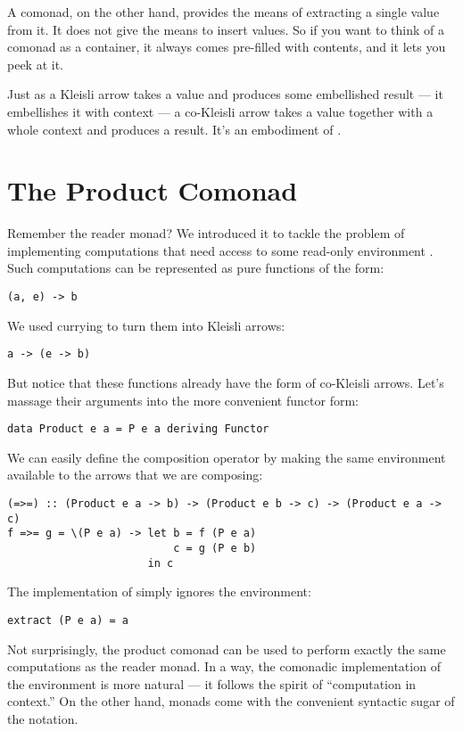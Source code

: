 A comonad, on the other hand, provides the means of extracting a single
value from it. It does not give the means to insert values. So if you
want to think of a comonad as a container, it always comes pre-filled
with contents, and it lets you peek at it.

Just as a Kleisli arrow takes a value and produces some embellished
result --- it embellishes it with context --- a co-Kleisli arrow takes a
value together with a whole context and produces a result. It's an
embodiment of .

\section{The Product Comonad}\label{the-product-comonad}

Remember the reader monad? We introduced it to tackle the problem of
implementing computations that need access to some read-only environment
. Such computations can be represented as pure functions of
the form:

\begin{verbatim}
(a, e) -> b
\end{verbatim}
We used currying to turn them into Kleisli arrows:

\begin{verbatim}
a -> (e -> b)
\end{verbatim}
But notice that these functions already have the form of co-Kleisli
arrows. Let's massage their arguments into the more convenient functor
form:

\begin{verbatim}
data Product e a = P e a deriving Functor
\end{verbatim}
We can easily define the composition operator by making the same
environment available to the arrows that we are composing:

\begin{verbatim}
(=>=) :: (Product e a -> b) -> (Product e b -> c) -> (Product e a -> c)
f =>= g = \(P e a) -> let b = f (P e a)
                          c = g (P e b) 
                      in c
\end{verbatim}
The implementation of  simply ignores the environment:

\begin{verbatim}
extract (P e a) = a
\end{verbatim}
Not surprisingly, the product comonad can be used to perform exactly the
same computations as the reader monad. In a way, the comonadic
implementation of the environment is more natural --- it follows the
spirit of ``computation in context.'' On the other hand, monads come
with the convenient syntactic sugar of the  notation.

